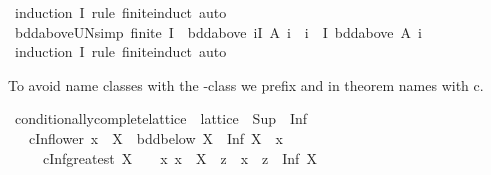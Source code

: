 \begin{isabellebody}
%
\isadelimproof
%
\endisadelimproof
%
\isatagproof
{}\isamarkupfalse%
\ {\isacharparenleft}{\kern0pt}induction\ I\ rule{\isacharcolon}{\kern0pt}\ finite{\isachardot}{\kern0pt}induct{\isacharparenright}{\kern0pt}\ auto%
\endisatagproof
{\isafoldproof}%
%
\isadelimproof
\isanewline
%
\endisadelimproof
\isanewline
{}\isamarkupfalse%
\ bdd{\isacharunderscore}{\kern0pt}above{\isacharunderscore}{\kern0pt}UN{\isacharbrackleft}{\kern0pt}simp{\isacharbrackright}{\kern0pt}{\isacharcolon}{\kern0pt}\ {\isachardoublequoteopen}finite\ I\ {\isasymLongrightarrow}\ bdd{\isacharunderscore}{\kern0pt}above\ {\isacharparenleft}{\kern0pt}{\isasymUnion}i{\isasymin}I{\isachardot}{\kern0pt}\ A\ i{\isacharparenright}{\kern0pt}\ {\isacharequal}{\kern0pt}\ {\isacharparenleft}{\kern0pt}{\isasymforall}i\ {\isasymin}\ I{\isachardot}{\kern0pt}\ bdd{\isacharunderscore}{\kern0pt}above\ {\isacharparenleft}{\kern0pt}A\ i{\isacharparenright}{\kern0pt}{\isacharparenright}{\kern0pt}{\isachardoublequoteclose}\isanewline
%
\isadelimproof
%
\endisadelimproof
%
\isatagproof
{}\isamarkupfalse%
\ {\isacharparenleft}{\kern0pt}induction\ I\ rule{\isacharcolon}{\kern0pt}\ finite{\isachardot}{\kern0pt}induct{\isacharparenright}{\kern0pt}\ auto%
\endisatagproof
{\isafoldproof}%
%
\isadelimproof
\isanewline
%
\endisadelimproof
\isanewline
{}\isamarkupfalse%
%
\begin{isamarkuptext}%
To avoid name classes with the -class we prefix  and
 in theorem names with c.%
\end{isamarkuptext}\isamarkuptrue%
\isamarkupfalse%
\ conditionally{\isacharunderscore}{\kern0pt}complete{\isacharunderscore}{\kern0pt}lattice\ {\isacharequal}{\kern0pt}\ lattice\ {\isacharplus}{\kern0pt}\ Sup\ {\isacharplus}{\kern0pt}\ Inf\ {\isacharplus}{\kern0pt}\isanewline
\ \ \ cInf{\isacharunderscore}{\kern0pt}lower{\isacharcolon}{\kern0pt}\ {\isachardoublequoteopen}x\ {\isasymin}\ X\ {\isasymLongrightarrow}\ bdd{\isacharunderscore}{\kern0pt}below\ X\ {\isasymLongrightarrow}\ Inf\ X\ {\isasymle}\ x{\isachardoublequoteclose}\isanewline
\ \ \ \ \ cInf{\isacharunderscore}{\kern0pt}greatest{\isacharcolon}{\kern0pt}\ {\isachardoublequoteopen}X\ {\isasymnoteq}\ {\isacharbraceleft}{\kern0pt}{\isacharbraceright}{\kern0pt}\ {\isasymLongrightarrow}\ {\isacharparenleft}{\kern0pt}{\isasymAnd}x{\isachardot}{\kern0pt}\ x\ {\isasymin}\ X\ {\isasymLongrightarrow}\ z\ {\isasymle}\ x{\isacharparenright}{\kern0pt}\ {\isasymLongrightarrow}\ z\ {\isasymle}\ Inf\ X{\isachardoublequoteclose}\isanewline

\end{isabellebody}
